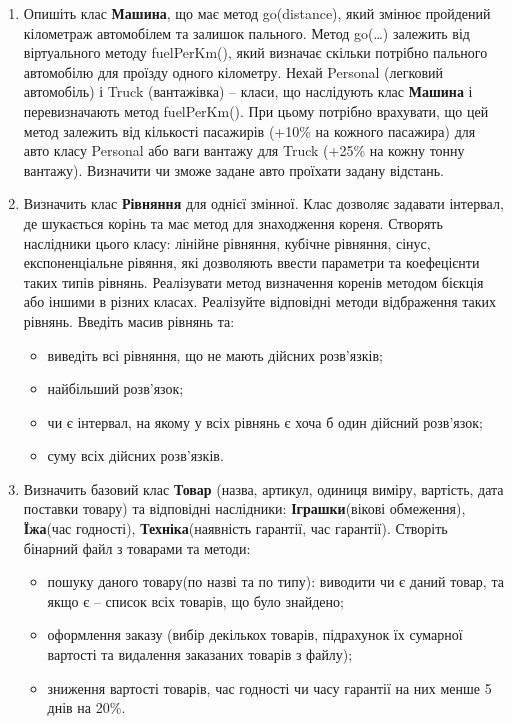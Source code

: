 \documentclass[a5paper,titlepage,openany,twoside,draft]{book_unv}%
\begin{document}
\begin{enumerate}
\item
  Опишіть клас \textbf{Машина}, що має метод go(distance), який змінює пройдений
  кілометраж автомобілем та залишок пального. Метод go(\ldots{})
  залежить від віртуального методу fuelPerKm(), який визначає скільки
  потрібно пального автомобілю для проїзду одного кілометру. Нехай
  Personal (легковий автомобіль) і Truck (вантажівка) -- класи, що
  наслідують клас \textbf{Машина} і перевизначають метод fuelPerKm(). При цьому
  потрібно врахувати, що цей метод залежить від кількості пасажирів
  (+10\% на кожного пасажира) для авто класу Personal або ваги вантажу
  для Truck (+25\% на кожну тонну вантажу). Визначити чи зможе задане
  авто проїхати задану відстань.

\item
Визначить клас \textbf{Рівняння} для однієї змінної. Клас дозволяє задавати інтервал,
де шукається корінь та має метод для знаходження кореня.
Створять наслідники цього класу: лінійне рівняння, кубічне рівняння, сінус,
експоненціальне рівяння, які дозволяють ввести параметри та коефецієнти таких типів
рівнянь. Реалізувати метод визначення коренів методом бієкція або іншими
в різних класах. Реалізуйте відповідні методи відбраження таких рівнянь.
Введіть масив рівнянь та:
\begin{itemize}
\item
виведіть всі рівняння, що не мають дійсних розв'язків;
\item
найбільший розв'язок;
\item
чи є інтервал, на якому у всіх рівнянь є хоча б один дійсний розв'язок;
\item
суму всіх дійсних розв'язків.
\end{itemize}

\item
Визначить базовий клас \textbf{Товар} 
(назва, артикул, одиниця виміру, вартість, дата поставки товару) та відповідні наслідники:
\textbf{Іграшки}(вікові обмеження), \textbf{Їжа}(час годності), \textbf{Техніка}(наявність гарантії, час гарантії).
Створіть бінарний файл з товарами та методи:
\begin{itemize}
\item
 пошуку даного товару(по назві та по типу): 
виводити чи є даний товар, та якщо є -- 
список всіх товарів, що було знайдено; 
\item
оформлення заказу (вибір декількох товарів, 
підрахунок їх сумарної вартості та видалення
 заказаних товарів з файлу);
\item
зниження вартості товарів, час годності чи часу гарантії на них менше 5 днів на 20\%.
\end{itemize}


\end{enumerate}
\end{document}
